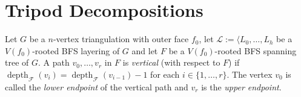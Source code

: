 \documentclass{patmorin}
\DeclareMathOperator{\depth}{depth}
\begin{document}
%
%
%
%

\section{Tripod Decompositions}


Let $G$ be a $n$-vertex triangulation with outer face $f_0$, let $\mathcal{L}:=\langle L_0,\ldots,L_h$ be a $V(f_0)$-rooted BFS layering of $G$ and let $F$ be a $V(f_0)$-rooted BFS spanning tree of $G$.  A path $v_0,\ldots,v_r$ in $F$ is \emph{vertical} (with respect to $F$) if $\depth_\mathcal{F}(v_i)=\depth_{\mathcal{F}}(v_{i-1})-1$ for each $i\in\{1,\ldots,r\}$. The vertex $v_0$ is called the \emph{lower endpoint} of the vertical path and $v_r$ is the \emph{upper endpoint}.
\end{document}

